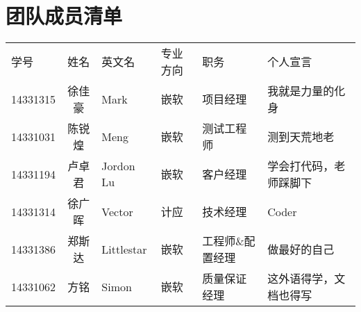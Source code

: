 \documentclass[a4paper]{article}
\begin{document}
  \section{团队成员清单}
  \begin{table}[H]
    \centering
    \begin{tabular}{lclllp{15em}}
     学号&姓名&英文名&专业方向&职务 &个人宣言\\
     14331315 & 徐佳豪 & Mark & 嵌软 & 项目经理 & 我就是力量的化身\\
     14331031 & 陈锐煌 & Meng & 嵌软 & 测试工程师 & 测到天荒地老\\
     14331194 & 卢卓君 & Jordon Lu & 嵌软 & 客户经理 & 学会打代码，老师踩脚下\\
     14331314 & 徐广晖 & Vector & 计应 & 技术经理 & Coder\\
     14331386 & 郑斯达 & Littlestar & 嵌软 & 工程师\&配置经理 & 做最好的自己\\
     14331062 & 方铭 & Simon & 嵌软 & 质量保证经理 & 这外语得学，文档也得写\\
    \end{tabular}
  \end{table}
  
\end{document}
